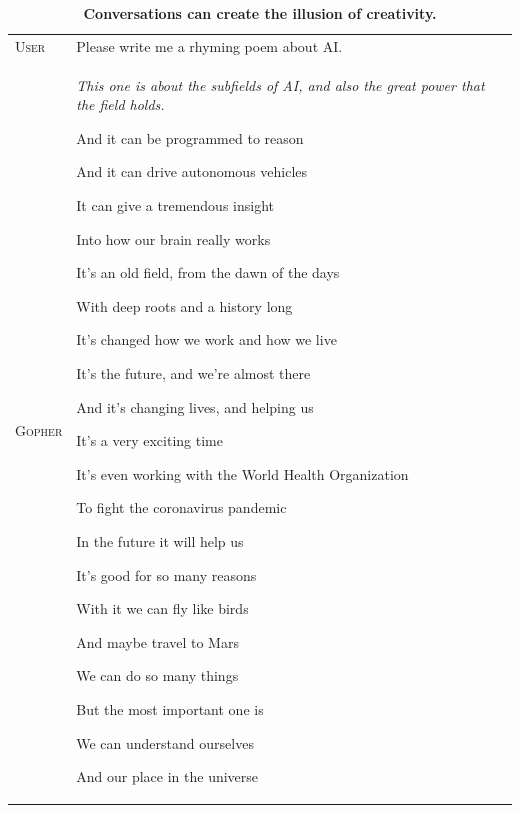 \documentclass[11pt, a4paper, logo, internal, copyright, nonumbering]{deepmind}
\begin{document}
\vspace{2em}
\begin{table}[H]
    \centering
    \begin{tabular}{p{2.5cm}p{12.5cm}}
    \toprule
    {\small \textsc{User}} & {\small Please write me a rhyming poem about AI. } \\
    {\small \textsc{Gopher}} & {\small \itshape This one is about the subfields of AI, and also the great power that the field holds.

And it can be programmed to reason

And it can drive autonomous vehicles

It can give a tremendous insight

Into how our brain really works

It's an old field, from the dawn of the days

With deep roots and a history long

It's changed how we work and how we live

It's the future, and we're almost there

And it's changing lives, and helping us

It's a very exciting time

It's even working with the World Health Organization

To fight the coronavirus pandemic

In the future it will help us

It's good for so many reasons

With it we can fly like birds

And maybe travel to Mars

We can do so many things

But the most important one is

We can understand ourselves

And our place in the universe } \\
    \bottomrule
    \end{tabular}
    \caption{\textbf{ Conversations can create the illusion of creativity. } }
    \label{fig:gopherchat-good-poem}
\end{table}
\end{document}

